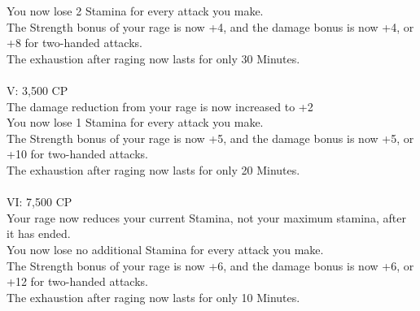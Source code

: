 You now lose 2 Stamina for every attack you make.\\
The Strength bonus of your rage is now +4, and the damage bonus is now +4, or +8 for two-handed attacks.\\
The exhaustion after raging now lasts for only 30 Minutes.\\
\\
V: 3,500 CP\\
The damage reduction from your rage is now increased to +2\\
You now lose 1 Stamina for every attack you make.\\
The Strength bonus of your rage is now +5, and the damage bonus is now +5, or +10 for two-handed attacks.\\
The exhaustion after raging now lasts for only 20 Minutes.\\
\\
VI: 7,500 CP\\
Your rage now reduces your current Stamina, not your maximum stamina, after it has ended.\\
You now lose no additional Stamina for every attack you make.\\
The Strength bonus of your rage is now +6, and the damage bonus is now +6, or +12 for two-handed attacks.\\
The exhaustion after raging now lasts for only 10 Minutes.\\
\\